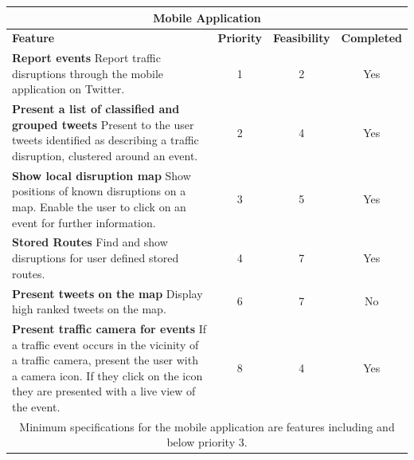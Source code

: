 \begin{center}
\begin{tabular}{ | p{8.5cm} | c | c | c | }
\hline
\multicolumn{4}{|c|}{\textbf{Mobile Application}} \\ \hline
\textbf{Feature} & \textbf{Priority} & \textbf{Feasibility} & \textbf{Completed} \\ \hline
\textbf{Report events}\newline
Report traffic disruptions through the mobile application on Twitter. & 1 & 2 & Yes \\ \hline

\textbf{Present a list of classified and grouped tweets}\newline
Present to the user tweets identified as describing a traffic disruption,
clustered around an event. & 2 & 4 & Yes \\ \hline

\textbf{Show local disruption map}\newline
Show positions of known disruptions on a map. Enable the user to click on an event for further information. & 3 & 5 & Yes \\ \hline

\textbf{Stored Routes}\newline
Find and show disruptions for user defined stored routes. & 4 & 7 & Yes \\ \hline \hline

\textbf{Present tweets on the map}\newline 
Display high ranked tweets on the map.& 6 & 7 & No \\ \hline 

\textbf{Present traffic camera for events}\newline
If a traffic event occurs in the vicinity of a traffic camera, present the user
with a camera icon. If they click on the icon they are presented with a live
view of the event. &  8 & 4 & Yes \\ \hline

\multicolumn{4}{|c|}{Minimum specifications for the mobile application are
features including and below priority 3.} \\ \hline
\end{tabular}
\end{center}
